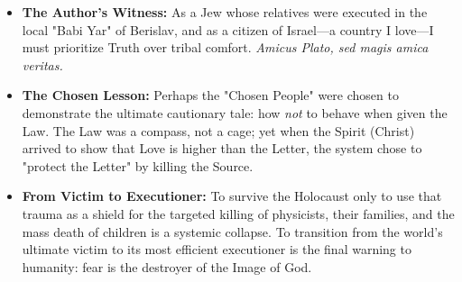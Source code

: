 \documentclass[11pt,a4paper]{article}
\theoremstyle{definition}
\theoremstyle{remark}
\begin{document}
\begin{itemize}
    \item \textbf{The Author's Witness:} As a Jew whose relatives were executed in the local "Babi Yar" of Berislav, and as a citizen of Israel—a country I love—I must prioritize Truth over tribal comfort. \textit{Amicus Plato, sed magis amica veritas.} 
    
    \item \textbf{The Chosen Lesson:} Perhaps the "Chosen People" were chosen to demonstrate the ultimate cautionary tale: how \textit{not} to behave when given the Law. The Law was a compass, not a cage; yet when the Spirit (Christ) arrived to show that Love is higher than the Letter, the system chose to "protect the Letter" by killing the Source.
    
    \item \textbf{From Victim to Executioner:} To survive the Holocaust only to use that trauma as a shield for the targeted killing of physicists, their families, and the mass death of children is a systemic collapse. To transition from the world's ultimate victim to its most efficient executioner is the final warning to humanity: fear is the destroyer of the Image of God.
\end{itemize}

\end{document}
